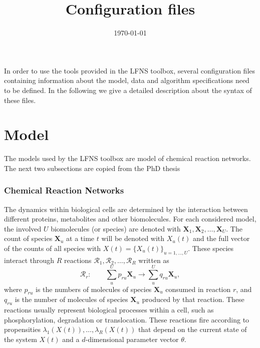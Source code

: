 \documentclass[11pt]{article} %
\title{Configuration files}
\date{\today} %
\begin{document}
\tableofcontents
\maketitle
In order to use the tools provided in the LFNS toolbox, several configuration files containing information about the model, data and algorithm specifications need to be defined. In the following we give a detailed description about the syntax of these files. 

\part{Model}
The models used by the LFNS toolbox are model of chemical reaction networks. The next two subsections are copied from the PhD thesis 


  \parbox{\textwidth}{
}


\section{Chemical Reaction Networks}
\label{sec:crn}
The dynamics within biological cells are determined by the interaction between different proteins, metabolites and other biomolecules. For each considered model, the involved $U$ biomolecules (or species) are denoted  with $\bm{X}_1, \bm{X}_2, \ldots, \bm{X}_U$. The count of species $\bm{X}_u$ at a time $t$ will be denoted with $X_u(t)$ and the full vector of the counts of all species with $X(t) = \{X_u(t)\}_{u = 1, \ldots, U}$. 
These species interact through $R$ reactions $\mathcal{R}_1, \mathcal{R}_2, \ldots, \mathcal{R}_R$ written as 
\begin{equation}
\mathcal{R}_r :\qquad \sum\limits_{u}^U p_{ru}\bm{X}_u \rightarrow \sum\limits_{u}^Uq_{ru} \bm{X}_u,
\label{eq:reactions}
\end{equation}
where $p_{ru}$ is the numbers of molecules of species $\bm{X}_u$  consumed in reaction $r$, and $q_{ru}$ is the number of molecules of species $\bm{X}_u$ produced by that reaction. These reactions usually represent biological processes within a cell, such as phosphorylation, degradation or translocation. These reactions fire according to propensities $\lambda_1\left(X(t)\right), \ldots, \lambda_R\left(X(t)\right)$ that depend on the current state of the system $X(t)$ and a $d$-dimensional parameter vector $\theta$. 
\end{document}
